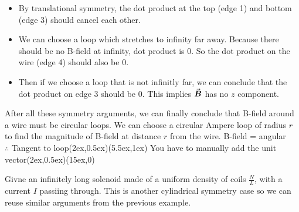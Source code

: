 \documentclass[class=article, crop=false, 12pt]{standalone}
\begin{document}
\begin{example}
\begin{enumerate}
        \begin{itemize}
            \item By translational symmetry, 
            the dot product at the top (edge 1) and bottom (edge 3) should cancel each other. 

            \item We can choose a loop which stretches to infinity far away.
            Because there should be no B-field at infinity, dot product is $0$.
            So the dot product on the wire (edge 4) should also be $0$.

            \item Then if we choose a loop that is not infinitly far,
            we can conclude that the dot product on edge 3 should be $0$.
            This implies $\va*{B}$ has no $z$ component.
        \end{itemize}
    \end{enumerate}

    After all these symmetry arguments,
    we can finally conclude that B-field around a wire must be circular loops. 
    We can choose a circular Ampere loop of radius $r$ to find the magnitude of B-field
    at distance $r$ from the wire.
    {\scriptsize B-field = angular \\[-1ex]\scriptsize $\therefore$ Tangent to loop}{(2ex,0.5ex)}{(5.5ex,1ex)}
    {\scriptsize You have to manually add the unit vector}{(2ex,0.5ex)}{(15ex,0)}


\end{example}


\begin{example}
    Givne an infinitely long solenoid made of a uniform density of coils $\frac{N}{L}$,
    with a current $I$ passiing through.
    This is another cylindrical symmetry case 
    so we can reuse similar arguments from the previous example.
    
    
    

\end{example}
\end{document}
